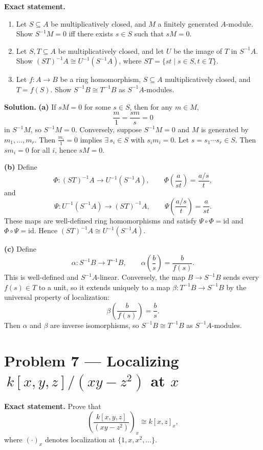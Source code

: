 \documentclass[12pt,a4paper]{article}
\theoremstyle{plain}
\theoremstyle{definition}      %
\begin{document}
	\textbf{Exact statement.}
	\begin{enumerate}
		\item[(a)] Let \(S\subseteq A\) be multiplicatively closed, and \(M\) a finitely generated \(A\)-module.
		Show \(S^{-1}M=0\) iff there exists \(s\in S\) such that \(sM=0\).
		\item[(b)] Let \(S,T\subseteq A\) be multiplicatively closed, and let \(U\) be the image of \(T\) in \(S^{-1}A\).
		Show \((ST)^{-1}A \cong U^{-1}(S^{-1}A)\), where \(ST=\{st\mid s\in S,t\in T\}\).
		\item[(c)] Let \(f:A\to B\) be a ring homomorphism, \(S\subseteq A\) multiplicatively closed, and \(T=f(S)\).
		Show \(S^{-1}B\cong T^{-1}B\) as \(S^{-1}A\)-modules.
	\end{enumerate}
	
	\textbf{Solution.}
	\textbf{(a)} If \(sM=0\) for some \(s\in S\), then for any \(m\in M\),
	\[
	\frac{m}{1}=\frac{sm}{s}=0
	\]
	in \(S^{-1}M\), so \(S^{-1}M=0\).
	Conversely, suppose \(S^{-1}M=0\) and \(M\) is generated by \(m_1,\dots,m_r\).
	Then \(\frac{m_i}{1}=0\) implies \(\exists\,s_i\in S\) with \(s_i m_i=0\).
	Let \(s=s_1\cdots s_r\in S\). Then \(sm_i=0\) for all \(i\), hence \(sM=0\).
	
	\medskip
	\textbf{(b)} Define
	\[
	\Phi:(ST)^{-1}A \to U^{-1}(S^{-1}A),\qquad \Phi\!\left(\frac{a}{st}\right)=\frac{a/s}{t},
	\]
	and
	\[
	\Psi:U^{-1}(S^{-1}A)\to (ST)^{-1}A,\qquad \Psi\!\left(\frac{a/s}{t}\right)=\frac{a}{st}.
	\]
	These maps are well-defined ring homomorphisms and satisfy \(\Psi\circ\Phi=\mathrm{id}\) and \(\Phi\circ\Psi=\mathrm{id}\).
	Hence \((ST)^{-1}A \cong U^{-1}(S^{-1}A)\).
	
	\medskip
	\textbf{(c)} Define
	\[
	\alpha:S^{-1}B\to T^{-1}B,\qquad \alpha\!\left(\frac{b}{s}\right)=\frac{b}{f(s)}.
	\]
	This is well-defined and \(S^{-1}A\)-linear. Conversely, the map \(B\to S^{-1}B\) sends every \(f(s)\in T\) to a unit,
	so it extends uniquely to a map \(\beta:T^{-1}B\to S^{-1}B\) by the universal property of localization:
	\[
	\beta\!\left(\frac{b}{f(s)}\right)=\frac{b}{s}.
	\]
	Then \(\alpha\) and \(\beta\) are inverse isomorphisms, so \(S^{-1}B\cong T^{-1}B\) as \(S^{-1}A\)-modules.
	
	\section*{Problem 7 — Localizing \(\,k[x,y,z]/(xy-z^2)\) at \(x\)}
	
	\textbf{Exact statement.}
	Prove that
	\[
	\left(\frac{k[x,y,z]}{(xy-z^2)}\right)_x \cong k[x,z]_x,
	\]
	where \((\cdot)_x\) denotes localization at \(\{1,x,x^2,\dots\}\).
	
\end{document}
